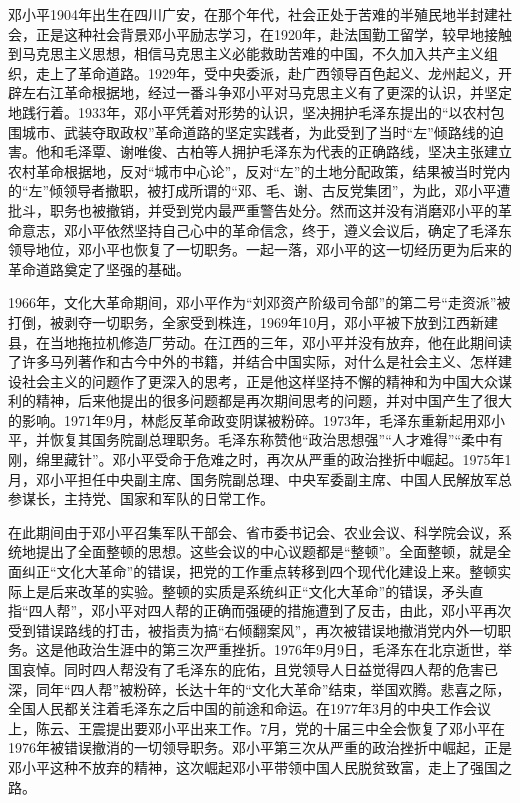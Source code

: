 \documentclass[cs4size,a4paper,nofonts]{ctexart}
\begin{document}
\newpage


邓小平1904年出生在四川广安，在那个年代，社会正处于苦难的半殖民地半封建社会，正是这种社会背景邓小平励志学习，在1920年，赴法国勤工留学，较早地接触到马克思主义思想，相信马克思主义必能救助苦难的中国，不久加入共产主义组织，走上了革命道路。1929年，受中央委派，赴广西领导百色起义、龙州起义，开辟左右江革命根据地，经过一番斗争邓小平对马克思主义有了更深的认识，并坚定地践行着。1933年，邓小平凭着对形势的认识，坚决拥护毛泽东提出的“以农村包围城市、武装夺取政权”革命道路的坚定实践者，为此受到了当时“左”倾路线的迫害。他和毛泽覃、谢唯俊、古柏等人拥护毛泽东为代表的正确路线，坚决主张建立农村革命根据地，反对“城市中心论”，反对“左”的土地分配政策，结果被当时党内的“左”倾领导者撤职，被打成所谓的“邓、毛、谢、古反党集团”，为此，邓小平遭批斗，职务也被撤销，并受到党内最严重警告处分。然而这并没有消磨邓小平的革命意志，邓小平依然坚持自己心中的革命信念，终于，遵义会议后，确定了毛泽东领导地位，邓小平也恢复了一切职务。一起一落，邓小平的这一切经历更为后来的革命道路奠定了坚强的基础。

1966年，文化大革命期间，邓小平作为“刘邓资产阶级司令部”的第二号“走资派”被打倒，被剥夺一切职务，全家受到株连，1969年10月，邓小平被下放到江西新建县，在当地拖拉机修造厂劳动。在江西的三年，邓小平并没有放弃，他在此期间读了许多马列著作和古今中外的书籍，并结合中国实际，对什么是社会主义、怎样建设社会主义的问题作了更深入的思考，正是他这样坚持不懈的精神和为中国大众谋利的精神，后来他提出的很多问题都是再次期间思考的问题，并对中国产生了很大的影响。1971年9月，林彪反革命政变阴谋被粉碎。1973年，毛泽东重新起用邓小平，并恢复其国务院副总理职务。毛泽东称赞他“政治思想强”“人才难得”“柔中有刚，绵里藏针”。邓小平受命于危难之时，再次从严重的政治挫折中崛起。1975年1月，邓小平担任中央副主席、国务院副总理、中央军委副主席、中国人民解放军总参谋长，主持党、国家和军队的日常工作。

在此期间由于邓小平召集军队干部会、省市委书记会、农业会议、科学院会议，系统地提出了全面整顿的思想。这些会议的中心议题都是“整顿”。全面整顿，就是全面纠正“文化大革命”的错误，把党的工作重点转移到四个现代化建设上来。整顿实际上是后来改革的实验。整顿的实质是系统纠正“文化大革命”的错误，矛头直指“四人帮”，邓小平对四人帮的正确而强硬的措施遭到了反击，由此，邓小平再次受到错误路线的打击，被指责为搞“右倾翻案风”，再次被错误地撤消党内外一切职务。这是他政治生涯中的第三次严重挫折。1976年9月9日，毛泽东在北京逝世，举国哀悼。同时四人帮没有了毛泽东的庇佑，且党领导人日益觉得四人帮的危害已深，同年“四人帮”被粉碎，长达十年的“文化大革命”结束，举国欢腾。悲喜之际，全国人民都关注着毛泽东之后中国的前途和命运。在1977年3月的中央工作会议上，陈云、王震提出要邓小平出来工作。7月，党的十届三中全会恢复了邓小平在1976年被错误撤消的一切领导职务。邓小平第三次从严重的政治挫折中崛起，正是邓小平这种不放弃的精神，这次崛起邓小平带领中国人民脱贫致富，走上了强国之路。
\end{document}
